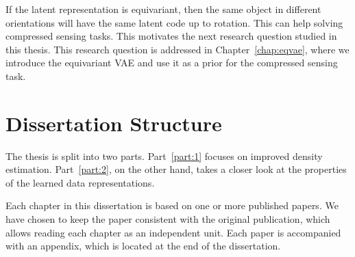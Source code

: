 If the latent representation is equivariant, then the same object in different orientations will have the same latent code up to rotation. This can help solving compressed sensing tasks. 
This motivates the next research question studied in this thesis. 
This research question is addressed in Chapter~\ref{chap:eqvae}, where we introduce the equivariant VAE and use it as a prior for the compressed sensing task. 

\section{Dissertation Structure}
The thesis is split into two parts. Part~\ref{part:1} focuses on improved density estimation. Part~\ref{part:2}, on the other hand, takes a closer look at the properties of the learned data representations. 

Each chapter in this dissertation is based on one or more published papers.
We have chosen to keep the paper consistent with the original publication, which allows reading each chapter as an independent unit. 
Each paper is accompanied with an appendix, which is located at the end of the dissertation.



